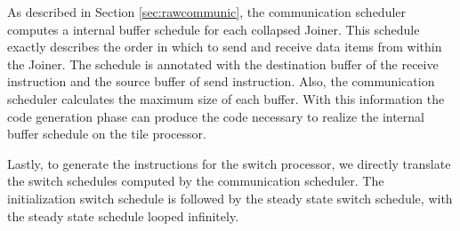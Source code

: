As described
in Section \ref{sec:rawcommunic}, the communication scheduler computes
a internal buffer schedule for each collapsed Joiner.  This schedule
exactly describes the order in which to send and receive data items
from within the Joiner.  The schedule is annotated with the
destination buffer of the receive instruction and the source buffer of
send instruction.  Also, the communication scheduler calculates the
maximum size of each buffer.  With this information the code
generation phase can produce the code necessary to realize the
internal buffer schedule on the tile processor.

Lastly, to generate the instructions for the switch processor, we
directly translate the switch schedules computed by the communication
scheduler.  The initialization switch schedule is followed by the steady
state switch schedule, with the steady state schedule looped infinitely.
